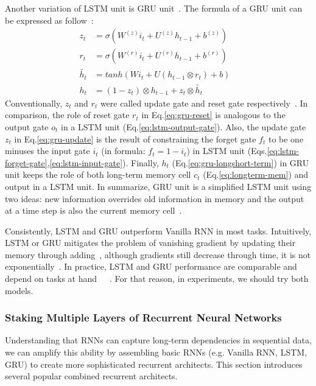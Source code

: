 \label{sec:GRU}
Another variation of LSTM unit is GRU unit~\cite{GRU}. 
The formula of a  GRU unit can be expressed as follow~\cite{colah-lsmt}:
\begin{align}
    z_t &= \sigma(W^{(z)}i_t + U^{(z)}h_{t-1} + b^{(z)}) \label{eq:gru-update}&\\ 
      r_t &= \sigma(W^{(r)}i_t + U^{(r)}h_{t-1} + b^{(r)}) \label{eq:gru-reset}&\\ 
      \tilde{h_t} &= tanh(Wi_t + U(h_{t-1} \otimes r_t) + b) &\\
      h_t &= (1-z_t) \otimes h_{t-1} + z_t \otimes \tilde{h_t} \label{eq:gru-longshort-term}&
\end{align}
Conventionally, \(z_t\) and \(r_t\) were called update gate and reset gate respectively~\cite{GRU}. 
In comparison, the role of reset gate \(r_t\) in Eq.\ref{eq:gru-reset} is analogous to the output gate \(o_t\) in a LSTM unit (Eq.\ref{eq:lstm-output-gate}).  
Also, the update gate \(z_t\) in Eq.\ref{eq:gru-update} is the result of constraining the forget gate \(f_t\) to be one minuses the input gate \(i_t\) (in formula: \(f_t = 1-i_t\)) in LSTM unit (Eqs.\ref{eq:lstm-forget-gate},\ref{eq:lstm-input-gate}).
Finally, \(h_t\) (Eq.\ref{eq:gru-longshort-term}) in GRU unit keeps the role of both long-term memory cell \(c_t\) (Eq.\ref{eq:longterm-mem}) and output in a LSTM unit. 
In summarize, GRU unit is a simplified LSTM unit using two ideas: new information overrides old information in memory and the output at a time step is also the current memory cell~\cite{evaluate-GRU}.  

Consistently, LSTM and GRU outperform Vanilla RNN in most tasks. 
Intuitively, LSTM or GRU mitigates the problem of vanishing gradient by updating their memory through adding~\cite{evaluate-GRU}, although gradients still decrease through time, it is not exponentially~\cite{Graves-thesis}. 
In practice, LSTM and GRU performance are comparable and depend on tasks at hand~\cite{understand-lstm}~\cite{evaluate-GRU}~\cite{lstm-search}. 
For that reason, in experiments, we should try both models. 

\subsubsection{Staking Multiple Layers of Recurrent Neural Networks}
Understanding that RNNs can capture long-term dependencies in sequential data, we can amplify this ability by assembling basic RNNs (e.g. Vanilla RNN, LSTM, GRU) to create more sophisticated recurrent architects.
This section introduces several popular combined recurrent architects.
 
